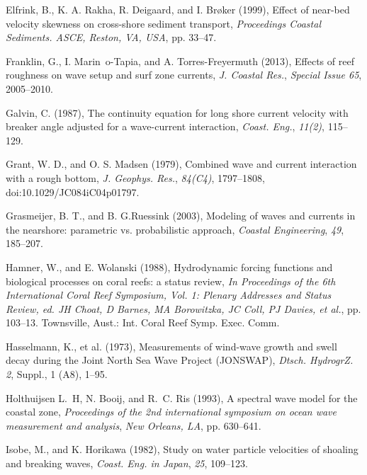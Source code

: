 \documentclass[default,jgrga]{agutex2015}
\begin{document}
\begin{article}
\begin{thebibliography}{}
Elfrink, B., K. A. Rakha, R. Deigaard, and I. Br{\o}ker (1999), Effect of near-bed velocity skewness on cross-shore sediment transport,  \textit{Proceedings Coastal Sediments. ASCE, Reston, VA, USA}, pp. 33--47.

Franklin, G., I. Marin~o-Tapia, and A. Torres-Freyermuth (2013), Effects of reef roughness on wave setup and surf zone currents, \textit{J. Coastal Res.}, \textit{Special Issue 65}, 2005--2010.

Galvin, C. (1987), The continuity equation for long shore current velocity with breaker angle adjusted for a wave-current interaction, \textit{Coast. Eng.}, \textit{11(2)}, 115--129.

Grant, W. D., and O. S. Madsen (1979), Combined wave and current interaction with a rough bottom, \textit{J. Geophys. Res.}, \textit{84(C4)}, 1797--1808, doi:10.1029/JC084iC04p01797.

Grasmeijer, B. T., and B. G.Ruessink (2003), Modeling of waves and currents in the nearshore: parametric vs. probabilistic approach, \textit{Coastal Engineering}, \textit{49}, 185--207.

Hamner, W., and E. Wolanski (1988), Hydrodynamic forcing functions and biological processes on coral reefs: a
status review, \textit{In Proceedings of the 6th International Coral Reef Symposium, Vol. 1: Plenary Addresses and Status Review, ed. JH Choat, D Barnes, MA Borowitzka, JC Coll, PJ Davies, et al.}, pp. 103--13. Townsville, Aust.: Int. Coral Reef Symp. Exec. Comm.

Hasselmann, K., et al. (1973), Measurements of wind-wave growth and swell decay during the Joint North Sea Wave Project (JONSWAP), \textit{Dtsch. HydrogrZ. 2}, Suppl., 1 (A8), 1--95.

Holthuijsen L.~H, N. Booij, and R.~C. Ris (1993), A spectral wave model for the coastal zone, \textit{Proceedings of the 2nd international symposium on ocean wave measurement and analysis}, \textit{New Orleans, LA}, pp. 630--641.

Isobe, M., and K. Horikawa (1982), Study on water particle velocities of shoaling and breaking waves,  \textit{Coast. Eng. in Japan},  \textit{25}, 109--123.


\end{thebibliography}
\end{article}
\end{document}
